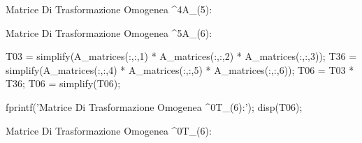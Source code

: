 \documentclass[11pt, a4paper]{article}
\begin{document}
\begin{matlaboutput}
Matrice Di Trasformazione Omogenea ^{4}A_(5):
\end{matlaboutput}
\begin{matlaboutput}
Matrice Di Trasformazione Omogenea ^{5}A_(6):
\end{matlaboutput}
\begin{matlabcode}

T03 = simplify(A_matrices(:,:,1) * A_matrices(:,:,2) * A_matrices(:,:,3));
T36 = simplify(A_matrices(:,:,4) * A_matrices(:,:,5) * A_matrices(:,:,6));
T06 = T03 * T36;
T06 = simplify(T06);

fprintf('Matrice Di Trasformazione Omogenea ^{0}T_(6):\n');
disp(T06);
\end{matlabcode}
\begin{matlaboutput}
Matrice Di Trasformazione Omogenea ^{0}T_(6):
\end{matlaboutput}
\end{document}
